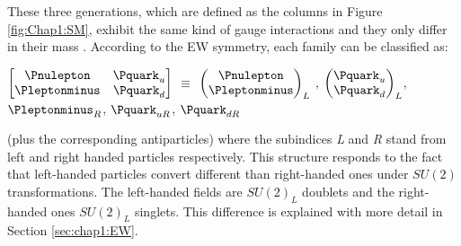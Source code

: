 These three generations, which are defined as the columns in Figure \ref{fig:Chap1:SM}, exhibit the same kind of 
gauge interactions and they only differ in their mass \cite{Pich:2007vu}.
According to the EW symmetry, each family can be classified as:
\begin{center}
$\begin{bmatrix}
\Pnulepton & \ensuremath{\Pquark_{u}} \\
\Pleptonminus & \ensuremath{\Pquark_{d}} 
\end{bmatrix}$
$\equiv$
$\begin{pmatrix}
\Pnulepton \\
\Pleptonminus
\end{pmatrix}_{L}$ ,
$\begin{pmatrix}
\ensuremath{\Pquark_{u}} \\
\ensuremath{\Pquark_{d}} 
\end{pmatrix}_{L}$,
$\Pleptonminus_R$, $\ensuremath{\Pquark_{uR}}$, $\ensuremath{\Pquark_{dR}}$
\end{center}
(plus the corresponding antiparticles) where the subindices \textit{L} and \textit{R} stand from left and right handed particles respectively. 
This structure responds to the fact that left-handed particles convert different than right-handed ones under $SU(2)$ transformations.
The left-handed fields are $SU(2)_L$ doublets and the right-handed ones $SU(2)_L$ singlets. This difference is explained with more
detail in Section \ref{sec:chap1:EW}. 

 

